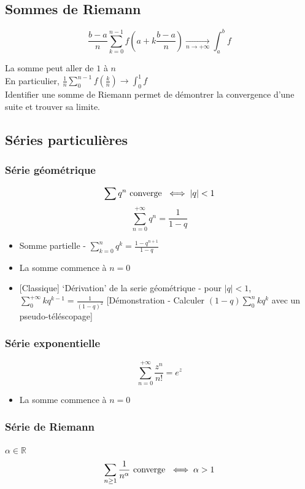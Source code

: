 \documentclass[openany]{book}
\begin{document}
\subsection{Sommes de Riemann}
\[ \frac{b-a}{n}\sum_{k=0}^{n-1} f(a + k\frac{b-a}{n}) \underset{n\rightarrow +\infty}{\longrightarrow} \int_{a}^{b} f \]

La somme peut aller de $1$ à $n$ \\

En particulier, $\frac{1}{n}\sum_{0}^{n-1} f(\frac{k}{n}) \longrightarrow \int_{0}^{1} f$ \\

Identifier une somme de Riemann permet de démontrer la convergence d'une suite et trouver sa limite. 

\subsection{Séries particulières}
\subsubsection{Série géométrique}
\[ \sum q^n \text{ converge } \iff |q| < 1 \]
\[ \sum_{n=0}^{+\infty} q^n = \frac{1}{1-q} \]

\begin{itemize}
    \item Somme partielle - $\sum_{k=0}^{n} q^k = \frac{1 - q^{n+1}}{1-q}$
    \item La somme commence à $n = 0$
    \item{} [Classique] `Dérivation' de la serie géométrique - pour $|q| < 1$, $\sum_{0}^{+\infty} kq^{k-1} = \frac{1}{(1-q)^2}$ [Démonstration - Calculer $(1-q)\sum_{0}^{n} kq^k$ avec un pseudo-téléscopage]
\end{itemize}

\subsubsection{Série exponentielle}
\[ \sum_{n=0}^{+\infty} \frac{z^n}{n!} = e^z \]

\begin{itemize}
    \item La somme commence à $n = 0$
\end{itemize}

\subsubsection{Série de Riemann}
$\alpha \in \mathbb{R}$
\[ \sum_{n \geq 1} \frac{1}{n^\alpha} \text{ converge } \iff \alpha > 1 \]
\end{document}
